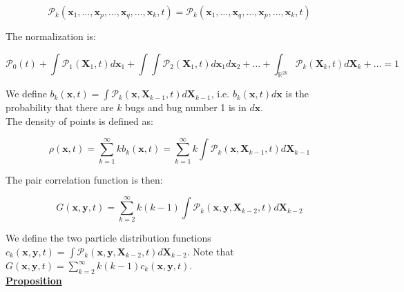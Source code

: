 \begin{equation}
\mathcal{P}_{k}(\boldsymbol{x}_{1},\ldots,\boldsymbol{x}_{p},\ldots,\boldsymbol{x}_{q},\ldots,\boldsymbol{x}_{k},t)=\mathcal{P}_{k}(\boldsymbol{x}_{1},\ldots,\boldsymbol{x}_{q},\ldots,\boldsymbol{x}_{p},\ldots,\boldsymbol{x}_{k},t)
\end{equation}

\vspace{1.25em}

The normalization is: 

\begin{equation}
\mathcal{P}_{0}(t)+\int\mathcal{P}_{1}(\boldsymbol{X}_{1},t)d\boldsymbol{x}_{1}+\int\int\mathcal{P}_{2}(\boldsymbol{X}_{1},t)d\boldsymbol{x}_{1}d\boldsymbol{x}_{2}+\ldots+\int_{\mathbb{R}^{2k}}\mathcal{P}_{k}(\boldsymbol{X}_{k},t)d\boldsymbol{X}_{k}+\ldots=1
\end{equation}

\vspace{1.25em}

We define $b_{k}(\boldsymbol{x},t)=\int\mathcal{P}_{k}(\boldsymbol{x},\boldsymbol{X}_{k-1},t)d\boldsymbol{X}_{k-1}$, i.e. $b_{k}(\boldsymbol{x},t)d\boldsymbol{x}$ is 
the probability that there are $k$ bugs and bug number 1 is in $d\boldsymbol{x}$.\\

The density of points is defined as:

\begin{equation}
\rho(\boldsymbol{x},t)=\sum_{k=1}^{\infty}kb_{k}(\boldsymbol{x},t)=\sum_{k=1}^{\infty}k\int\mathcal{P}_{k}(\boldsymbol{x},\boldsymbol{X}_{k-1},t)d\boldsymbol{X}_{k-1}
\end{equation}

The pair correlation function is then:

\begin{equation}
G(\boldsymbol{x},\boldsymbol{y},t)=\sum_{k=2}^{\infty}k(k-1)\int\mathcal{P}_{k}(\boldsymbol{x},\boldsymbol{y},\boldsymbol{X}_{k-2},t)d\boldsymbol{X}_{k-2} \label{eq:def_pairdens}
\end{equation}

We define the two particle distribution functions $c_{k}(\boldsymbol{x},\boldsymbol{y},t)=\int\mathcal{P}_{k}(\boldsymbol{x},\boldsymbol{y},\boldsymbol{X}_{k-2},t)d\boldsymbol{X}_{k-2}$. Note that $G(\boldsymbol{x},\boldsymbol{y},t)=\sum_{k=2}^{\infty}k(k-1)c_{k}(\boldsymbol{x},\boldsymbol{y},t)$.\\

\textbf{\underline{Proposition}}

